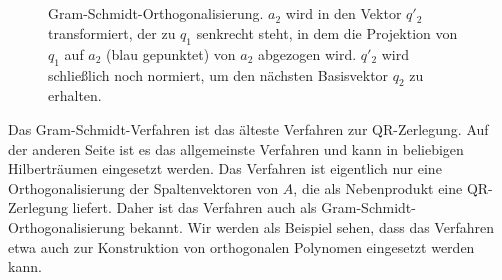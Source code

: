 \subsection{}

\begin{figure}
  \centering

  \caption{Gram-Schmidt-Orthogonalisierung. $a_2$ wird in den Vektor
    $q'_2$ transformiert, der zu $q_1$ senkrecht steht, in dem die
    Projektion von $q_1$ auf $a_2$ (blau gepunktet) von $a_2$
    abgezogen wird. $q'_2$ wird schließlich noch normiert, um den
    nächsten Basisvektor $q_2$ zu erhalten.}
  \label{fig:gs}
\end{figure}

Das Gram-Schmidt-Verfahren ist das älteste Verfahren zur
QR-Zerlegung. Auf der anderen Seite ist es das allgemeinste Verfahren
und kann in beliebigen Hilberträumen eingesetzt werden. Das Verfahren
ist eigentlich nur eine Orthogonalisierung der Spaltenvektoren von
$A$, die als Nebenprodukt eine QR-Zerlegung liefert. Daher ist das
Verfahren auch als Gram-Schmidt-Orthogonalisierung bekannt. Wir werden
als Beispiel sehen, dass das Verfahren etwa auch zur Konstruktion von
orthogonalen Polynomen eingesetzt werden kann.

